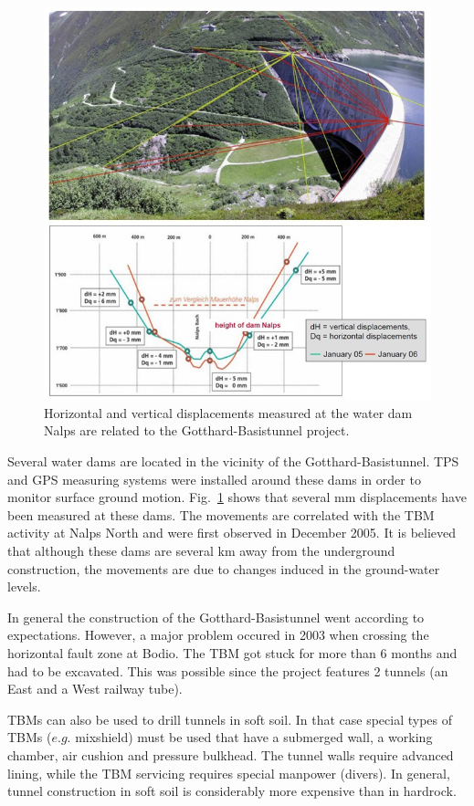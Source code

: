 \begin{figure}[htbp!]
\centering
\includegraphics[width=12cm]{./Sec_SiteInfra/Figures/dam.jpg}
\caption{Horizontal and vertical displacements measured at the water dam Nalps
are related to the Gotthard-Basistunnel project.}
\label{fig:dam}
\end{figure}
Several water dams are located in the vicinity of the Gotthard-Basistunnel.
TPS and GPS measuring systems were installed around these dams in order
to monitor surface ground motion. Fig.~\ref{fig:dam} shows that several
mm displacements have been measured at these dams. The movements
are correlated with the TBM activity at Nalps North and were first observed
in December 2005. It is believed that although these dams are several km away
from the underground construction, the movements are due to changes induced
in the ground-water levels.

In general the construction of the Gotthard-Basistunnel went according to
expectations. However, a major problem occured in 2003 when crossing the horizontal
fault zone at Bodio. The TBM got stuck for more than 6 months and had to
be excavated. This was possible since the project features 2 tunnels (an
East and a West railway tube).

TBMs can also be used to drill tunnels in
soft soil. In that case special types of TBMs ($e.g.$ mixshield) must be used that have
a submerged wall, a working chamber, air cushion and pressure bulkhead. The
tunnel walls require advanced lining, while the TBM servicing requires special
manpower (divers). In general, tunnel construction in soft soil is considerably more expensive
than in hardrock.

